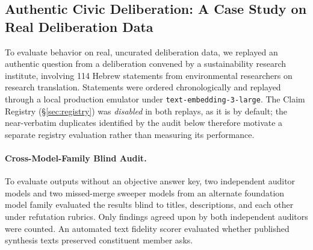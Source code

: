 \documentclass[11pt,a4paper]{article}
\begin{document}
\subsection{Authentic Civic Deliberation: A Case Study on Real Deliberation Data}
\label{sec:realdata}

To evaluate behavior on real, uncurated deliberation data, we replayed an authentic question from a deliberation convened by a sustainability research institute, involving 114 Hebrew statements from environmental researchers on research translation. Statements were ordered chronologically and replayed through a local production emulator under \texttt{text-embedding-3-large}. 
The Claim Registry (\S\ref{sec:registry}) was \emph{disabled} in both replays, as it is by default; the near-verbatim duplicates identified by the audit below therefore motivate a separate registry evaluation rather than measuring its performance.

\paragraph{Cross-Model-Family Blind Audit.} To evaluate outputs without an objective answer key, two independent auditor models and two missed-merge sweeper models from an alternate foundation model family evaluated the results blind to titles, descriptions, and each other under refutation rubrics. Only findings agreed upon by both independent auditors were counted. An automated text fidelity scorer evaluated whether published synthesis texts preserved constituent member asks.
\end{document}
